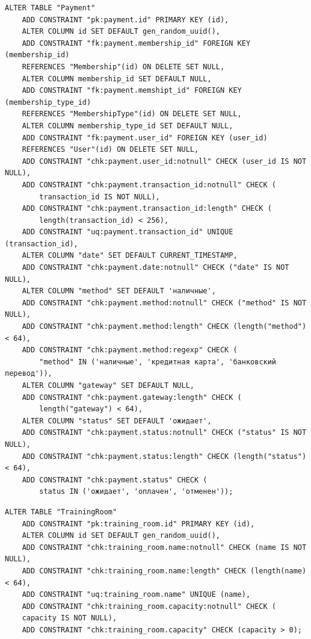 \newpage
\begin{lstlisting}[label=alg:23, caption=Реализация  ограничений целостности данных отношения Payment, captionpos=t]
ALTER TABLE "Payment"
	ADD CONSTRAINT "pk:payment.id" PRIMARY KEY (id),
	ALTER COLUMN id SET DEFAULT gen_random_uuid(),
	ADD CONSTRAINT "fk:payment.membership_id" FOREIGN KEY (membership_id) 
	REFERENCES "Membership"(id) ON DELETE SET NULL,
	ALTER COLUMN membership_id SET DEFAULT NULL,
	ADD CONSTRAINT "fk:payment.memshipt_id" FOREIGN KEY (membership_type_id) 
	REFERENCES "MembershipType"(id) ON DELETE SET NULL,
	ALTER COLUMN membership_type_id SET DEFAULT NULL,
	ADD CONSTRAINT "fk:payment.user_id" FOREIGN KEY (user_id) 
	REFERENCES "User"(id) ON DELETE SET NULL,
	ADD CONSTRAINT "chk:payment.user_id:notnull" CHECK (user_id IS NOT NULL),
	ADD CONSTRAINT "chk:payment.transaction_id:notnull" CHECK (
		transaction_id IS NOT NULL),
	ADD CONSTRAINT "chk:payment.transaction_id:length" CHECK (
		length(transaction_id) < 256),
	ADD CONSTRAINT "uq:payment.transaction_id" UNIQUE (transaction_id),
	ALTER COLUMN "date" SET DEFAULT CURRENT_TIMESTAMP,
	ADD CONSTRAINT "chk:payment.date:notnull" CHECK ("date" IS NOT NULL),
	ALTER COLUMN "method" SET DEFAULT 'наличные',
	ADD CONSTRAINT "chk:payment.method:notnull" CHECK ("method" IS NOT NULL),
	ADD CONSTRAINT "chk:payment.method:length" CHECK (length("method") < 64),
	ADD CONSTRAINT "chk:payment.method:regexp" CHECK (
		"method" IN ('наличные', 'кредитная карта', 'банковский перевод')),
	ALTER COLUMN "gateway" SET DEFAULT NULL,
	ADD CONSTRAINT "chk:payment.gateway:length" CHECK (
		length("gateway") < 64),
	ALTER COLUMN "status" SET DEFAULT 'ожидает',
	ADD CONSTRAINT "chk:payment.status:notnull" CHECK ("status" IS NOT NULL),
	ADD CONSTRAINT "chk:payment.status:length" CHECK (length("status") < 64),
	ADD CONSTRAINT "chk:payment.status" CHECK (
		status IN ('ожидает', 'оплачен', 'отменен'));
\end{lstlisting}

\begin{lstlisting}[label=alg:20, caption=Реализация  ограничений целостности данных отношения TrainingRoom, captionpos=t]
ALTER TABLE "TrainingRoom"
	ADD CONSTRAINT "pk:training_room.id" PRIMARY KEY (id),
	ALTER COLUMN id SET DEFAULT gen_random_uuid(),
	ADD CONSTRAINT "chk:training_room.name:notnull" CHECK (name IS NOT NULL),
	ADD CONSTRAINT "chk:training_room.name:length" CHECK (length(name) < 64),
	ADD CONSTRAINT "uq:training_room.name" UNIQUE (name),
	ADD CONSTRAINT "chk:training_room.capacity:notnull" CHECK (
	capacity IS NOT NULL),
	ADD CONSTRAINT "chk:training_room.capacity" CHECK (capacity > 0);
\end{lstlisting}

